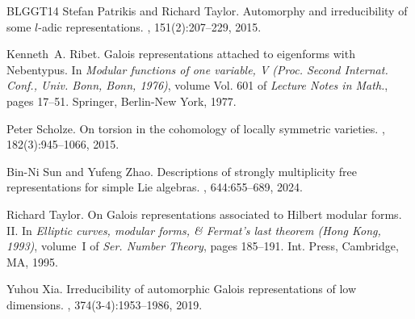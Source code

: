 \documentclass{amsart}
\theoremstyle{definition}
\numberwithin{equation}{section} %
\begin{document}
\begin{thebibliography}{BLGGT14}
Stefan Patrikis and Richard Taylor.
\newblock Automorphy and irreducibility of some {$l$}-adic representations.
, 151(2):207--229, 2015.

Kenneth~A. Ribet.
\newblock Galois representations attached to eigenforms with {N}ebentypus.
\newblock In {\em Modular functions of one variable, {V} ({P}roc. {S}econd {I}nternat. {C}onf., {U}niv. {B}onn, {B}onn, 1976)}, volume Vol. 601 of {\em Lecture Notes in Math.}, pages 17--51. Springer, Berlin-New York, 1977.

Peter Scholze.
\newblock On torsion in the cohomology of locally symmetric varieties.
, 182(3):945--1066, 2015.

Bin-Ni Sun and Yufeng Zhao.
\newblock Descriptions of strongly multiplicity free representations for simple {L}ie algebras.
, 644:655--689, 2024.

Richard Taylor.
\newblock On {G}alois representations associated to {H}ilbert modular forms. {II}.
\newblock In {\em Elliptic curves, modular forms, \& {F}ermat's last theorem ({H}ong {K}ong, 1993)}, volume~I of {\em Ser. Number Theory}, pages 185--191. Int. Press, Cambridge, MA, 1995.

Yuhou Xia.
\newblock Irreducibility of automorphic {G}alois representations of low dimensions.
, 374(3-4):1953--1986, 2019.

\end{thebibliography}
\end{document}
